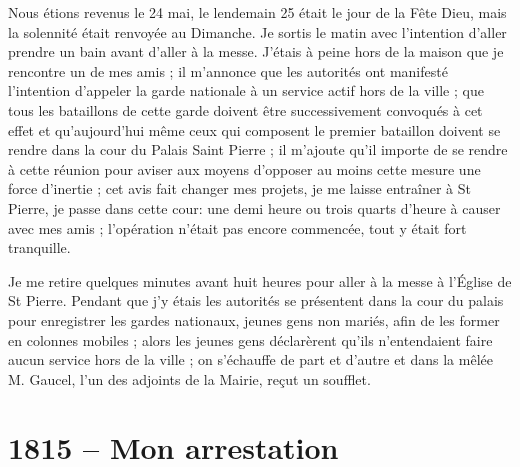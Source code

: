 \documentclass[11pt,a4paper]{report}
\begin{document}
Nous étions revenus le 24 mai, le lendemain 25 était le jour de la Fête Dieu, mais la solennité était renvoyée au Dimanche. Je sortis le matin avec l'intention d'aller prendre un bain avant d'aller à la messe. J'étais à peine hors de la maison que je rencontre un de mes amis ; il m'annonce que les autorités ont manifesté l'intention d'appeler la garde nationale à un service actif hors de la ville ; que tous les bataillons de cette garde doivent être successivement convoqués à cet effet et qu'aujourd'hui même ceux qui composent le premier bataillon doivent se rendre dans la cour du Palais Saint Pierre ; il m'ajoute qu'il importe de se rendre à cette réunion pour aviser aux moyens d'opposer au moins cette mesure une force d'inertie ; cet avis fait changer mes projets, je me laisse entraîner à St Pierre, je passe dans cette cour: une demi heure ou trois quarts d'heure à causer avec mes amis ; l'opération n'était pas encore commencée, tout y était fort tranquille.

Je me retire quelques minutes avant huit heures pour aller à la messe à l'Église de St Pierre. Pendant que j'y étais les autorités se présentent dans la cour du palais pour enregistrer les gardes nationaux, jeunes gens non mariés, afin de les former en colonnes mobiles ; alors les jeunes gens déclarèrent qu'ils n'entendaient faire aucun service hors de la ville ; on s'échauffe de part et d'autre et dans la mêlée M. Gaucel, l'un des adjoints de la Mairie, reçut un soufflet.

\section*{1815 -- Mon arrestation}
\end{document}
